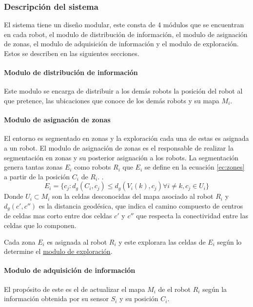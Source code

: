 \subsubsection{Descripción del sistema}
El sistema tiene un diseño modular, este consta de 4 módulos que se encuentran en cada robot, el modulo de distribución de información, el modulo de asignación de zonas, el modulo de adquisición de información y el modulo de exploración. Estos se describen en las siguientes secciones. 

\paragraph{Modulo de distribución de información}
Este modulo se encarga de distribuir a los demás robots la posición del robot al que pretence, las ubicaciones que conoce de los demás robots y su mapa $M_i$. 

\paragraph{Modulo de asignación de zonas }
El entorno es segmentado en zonas y la exploración cada una de estas es asignada a un robot. El modulo de asignación de zonas es el responsable de realizar la segmentación en zonas y su posterior asignación a los robots. La segmentación genera tantas zonas $E_i$ como robots $R_i$ que $E_i$ se define en la ecuación \ref{ec:zones} a partir de la posición $C_i$ de $R_i$. .
\begin{equation}\label{ec:zones}
  E_i=\{c_j:d_g(C_i,c_j)\leq d_g(V_i(k),c_j) \forall i \neq k , c_j \in U_i\}
\end{equation}
Donde $U_i \subset M_i$ son la celdas desconocidas del mapa asociado al robot $R_i$ y $d_g(c',c'')$ es la distancia geodésica, que indica el camino compuesto de centros de celdas mas corto entre dos celdas $c'$ y $c''$ que respecta la conectividad entre las celdas que lo componen.

Cada zona $E_i$ es asignada al robot $R_i$ y este explorara las celdas de $E_i$ según lo determine el \hyperref[par:estar:moduloexp]{modulo de exploración}.

\paragraph{Modulo de adquisición de información}
El propósito de este es el de actualizar el mapa $M_i$ de el robot $R_i$ según la información obtenida por su sensor $S_i$ y su posición $C_i$.

